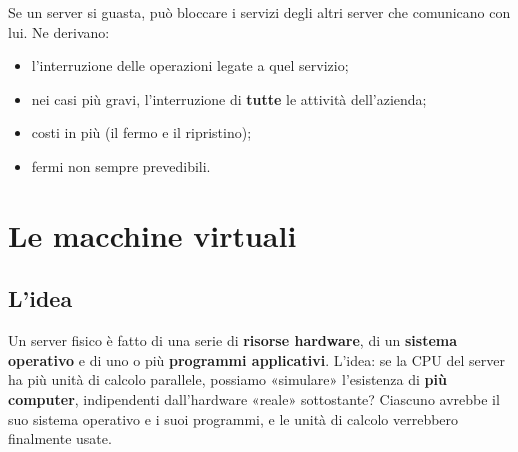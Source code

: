 \noindent\begin{minipage}[c]{0.5\textwidth}
\centering
{}
\end{minipage}\hfill
\begin{minipage}[c]{0.47\textwidth}
Se un server si guasta, può bloccare i servizi degli altri server che comunicano con lui. Ne derivano:
\begin{itemize}
  \item l'interruzione delle operazioni legate a quel servizio;
  \item nei casi più gravi, l'interruzione di \textbf{tutte} le attività dell'azienda;
  \item costi in più (il fermo e il ripristino);
  \item fermi non sempre prevedibili.
\end{itemize}
\end{minipage}

\section{Le macchine virtuali}

\subsection{L'idea}

Un server fisico è fatto di una serie di \textbf{risorse hardware}, di un \textbf{sistema operativo} e di uno o più
\textbf{programmi applicativi}. L'idea: se la CPU del server ha più unità di calcolo parallele, possiamo «simulare»
l'esistenza di \textbf{più computer}, indipendenti dall'hardware «reale» sottostante? Ciascuno avrebbe il suo sistema
operativo e i suoi programmi, e le unità di calcolo verrebbero finalmente usate.

